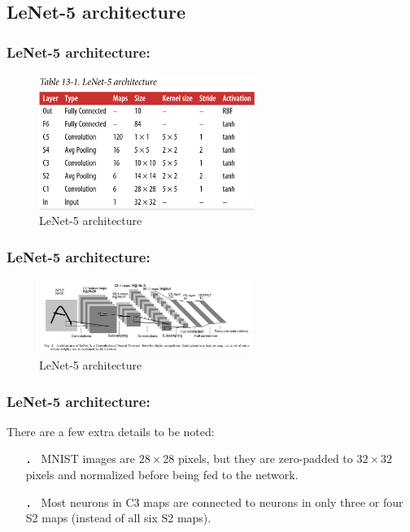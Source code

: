 \documentclass{beamer}
\begin{document}
\subsection{LeNet-5 architecture}
    \begin{frame}
    \frametitle{LeNet-5 architecture: }
            \begin{figure}[H]
            \begin{center}
                \includegraphics[width=7cm]{table13-1}
            \end{center}
        \caption{LeNet-5 architecture}
        \end{figure}
    \end{frame}
    \begin{frame}
    \frametitle{LeNet-5 architecture: }
            \begin{figure}[H]
            \begin{center}
                \includegraphics[width=7cm]{FIGURE13-10}
            \end{center}
        \caption{LeNet-5 architecture}
        \end{figure}
    \end{frame}
    \begin{frame} 
    \frametitle{LeNet-5 architecture: } 
    There are a few extra details to be noted:
        \begin{itemize}
            \item[．] MNIST images are $28 \times 28$ pixels, but they are zero-padded to $32 \times 32$ pixels and normalized before being fed to the network. 
            \item[．] Most  neurons  in  C3  maps  are  connected  to  neurons  in  only  three  or  four  S2 maps (instead of all six S2 maps). 
        \end{itemize}    
    \end{frame}  
\end{document}
